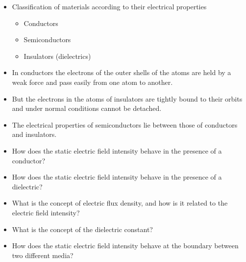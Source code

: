 
\begin{ELunit}


\begin{itemize}
\item
  Classification of materials according to their electrical properties

  \begin{itemize}
  \tightlist
  \item
    Conductors
  \item
    Semiconductors
  \item
    Insulators (dielectrics)
  \end{itemize}
\item
  In conductors the electrons of the outer shells of the atoms are held by a weak force and pass easily from one atom to another.
\item
  But the electrons in the atoms of insulators are tightly bound to their orbits and under normal conditions cannot be detached.
\item
  The electrical properties of semiconductors lie between those of conductors and insulators.
\item
  How does the static electric field intensity behave in the presence of a conductor?
\item
  How does the static electric field intensity behave in the presence of a dielectric?
\item
  What is the concept of electric flux density, and how is it related to the electric field intensity?
\item
  What is the concept of the dielectric constant?
\item
  How does the static electric field intensity behave at the boundary between two different media?
\end{itemize}

\end{ELunit}

\ELhold


